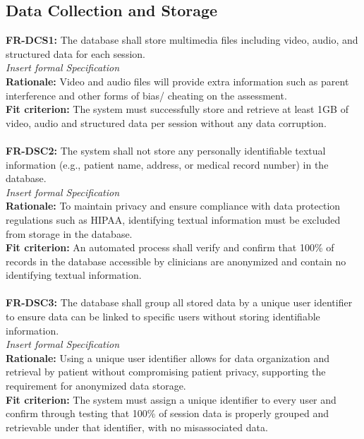 \documentclass[12pt]{article}
\begin{document}
\subsection{Data Collection and Storage}
\textbf{FR-DCS1: }The database shall store multimedia files including video, audio, and structured data for 
each session.\\
\textit{Insert formal Specification}\\
\textbf{Rationale: }Video and audio files will provide extra information such as parent interference and 
other forms of bias/ cheating on the assessment.\\
\textbf{Fit criterion: }The system must successfully store and retrieve at least 1GB of video, audio and 
structured data per session without any data corruption. \\\\
\textbf{FR-DSC2: }The system shall not store any personally identifiable textual information (e.g., patient name, 
address, or medical record number) in the database.\\
\textit{Insert formal Specification}\\
\textbf{Rationale: }To maintain privacy and ensure compliance with data protection regulations such as HIPAA, 
identifying textual information must be excluded from storage in the database.\\
\textbf{Fit criterion: }An automated process shall verify and confirm that 100\% of records in the database 
accessible by clinicians are anonymized and contain no identifying textual information.\\\\
\textbf{FR-DSC3: }The database shall group all stored data by a unique user identifier to ensure data can be linked 
to specific users without storing identifiable information.\\
\textit{Insert formal Specification}\\
\textbf{Rationale: }Using a unique user identifier allows for data organization and retrieval by patient without 
compromising patient privacy, supporting the requirement for anonymized data storage.\\
\textbf{Fit criterion: }The system must assign a unique identifier to every user and confirm through testing 
that 100\% of session data is properly grouped and retrievable under that identifier, with no misassociated 
data.\\\\
\end{document}
